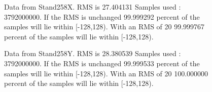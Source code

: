 \begin{figure}[ht] 				 				 				\caption{Data from Stand258X. RMS is 27.404131 Samples used : 3792000000. If the RMS is unchanged 99.999292 percent of the samples will lie within [-128,128).  				 With an RMS of 20 99.999767 percent of the samples will lie within [-128,128).} 				\end{figure} 

\begin{figure}[ht] 				 				 				\caption{Data from Stand258Y. RMS is 28.380539 Samples used : 3792000000. If the RMS is unchanged 99.999533 percent of the samples will lie within [-128,128).  				 With an RMS of 20 100.000000 percent of the samples will lie within [-128,128).} 				\end{figure} 


